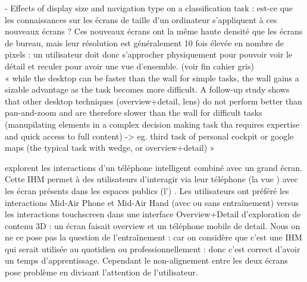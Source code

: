 \cite{Liu2014} - Effects of display size and navigation type on a classification task : est-ce que les connaissances sur les écrans de taille d'un ordinateur s'appliquent à ces nouveaux écrans ? Ces nouveaux écrans ont la même haute densité que les écrans de bureau, mais leur résolution est généralement 10 fois élevée en nombre de pixels : un utilisateur doit donc s'approcher physiquement pour pouvoir voir le détail et reculer pour avoir une vue d'ensemble. (voir fin cahier gris)\\
« while the desktop can be faster than the wall for simple tasks, the wall gains a sizable advantage as the task becomes more difficult. A follow-up study shows that other desktop techniques (overview+detail, lens) do not perform better than pan-and-zoom and are therefore slower than the wall for difficult tasks (manupilating elements in a complex decision making task tha requires expertise and quick access to full content) -> eg. third task of personal cockpit or google maps (the typical task with wedge, or overview+detail) »


\cite{Berge2014} explorent les interactions d'un téléphone intelligent combiné avec un grand écran. Cette IHM  permet à des utilisateurs d'interagir via leur téléphone (la vue ) avec les écran présents dans les espaces publics (l') . 
Les utilisateurs ont préféré les interactions Mid-Air Phone et Mid-Air Hand (avec ou sans entraînement) versus les interactions touchscreen dans une interface Overview+Detail d'exploration de contenu 3D : un écran faisait overview et un téléphone mobile de detail.
Nous on ne ce pose pas la question de l'entraînement : car on considère que c'est une IHM qui serait utilisée au quotidien ou professionnellement : donc c'est correct d'avoir un temps d'apprentissage.
Cependant le non-alignement entre les deux écrans pose problème en divisant l'attention de l'utilisateur.



